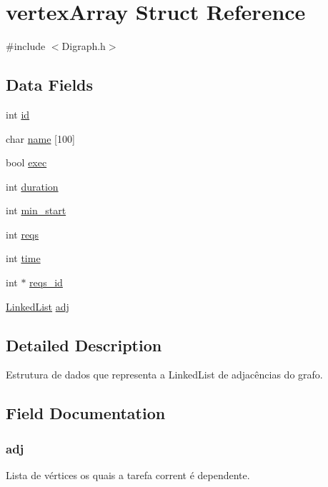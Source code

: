 \hypertarget{structvertex_array}{}\section{vertex\+Array Struct Reference}
\label{structvertex_array}


{\ttfamily \#include $<$Digraph.\+h$>$}

\subsection*{Data Fields}
\begin{DoxyCompactItemize}
\item 
int \hyperlink{structvertex_array_a7441ef0865bcb3db9b8064dd7375c1ea}{id}
\item 
char \hyperlink{structvertex_array_aeaf846aa21a7d016a52f0b5b0c2f5544}{name} \mbox{[}100\mbox{]}
\item 
bool \hyperlink{structvertex_array_a3002b469e7a03a16ba4fd99322d10020}{exec}
\item 
int \hyperlink{structvertex_array_ac6e4b2a3cf932b33832d4e4e4e7cd0de}{duration}
\item 
int \hyperlink{structvertex_array_af597b2d40f09352c45a7949e3efb475a}{min\+\_\+start}
\item 
int \hyperlink{structvertex_array_aafaa8921a9db42eefd598924305f2772}{reqs}
\item 
int \hyperlink{structvertex_array_a42715f65f02da52edc5b22021d8ae670}{time}
\item 
int $\ast$ \hyperlink{structvertex_array_adf15d2ca9e8f0bf7eb53e25582b79cda}{reqs\+\_\+id}
\item 
\hyperlink{_digraph_8h_ac8d6ca4ecd16f6814fa28c52d4f68d4c}{Linked\+List} \hyperlink{structvertex_array_a395ceb173448ed60d5236c77b9c163ae}{adj}
\end{DoxyCompactItemize}


\subsection{Detailed Description}
Estrutura de dados que representa a Linked\+List de adjacências do grafo. 

\subsection{Field Documentation}
\subsubsection[{\texorpdfstring{adj}{adj}}]{ adj}\hypertarget{structvertex_array_a395ceb173448ed60d5236c77b9c163ae}{}\label{structvertex_array_a395ceb173448ed60d5236c77b9c163ae}
Lista de vértices os quais a tarefa corrent é dependente. 
